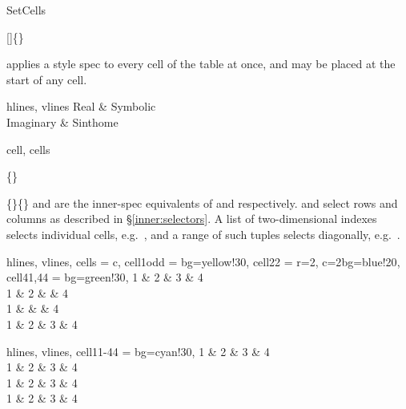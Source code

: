 \begin{codedescribe}[
    code,
    new=2021F,
    update=2021L
  ]{SetCells}
  \begin{codesyntax}
    []\{\} 
  \end{codesyntax}
   applies a style spec to every cell of the table at once, and may be placed at the start of any cell.

  \begin{codestore}[st=span:setcells]
    \begin{tblr}{hlines, vlines}
       Real & Symbolic \\
      Imaginary                       & Sinthome
    \end{tblr}\end{codestore}
  \begin{center}
  \end{center}
\end{codedescribe}

\begin{codedescribe}[
    key,
    new=2021F,
    update=2021L,
    update=2025A
  ]{cell, cells}
  \begin{codesyntax}
    \{\}  
  \end{codesyntax}
  \{\}\{\} and  are the inner-spec equivalents of  and  respectively.  and  select rows and columns as described in \S\ref{inner:selectors}. A list of two-dimensional indexes selects individual cells, e.g.\ , and a range of such tuples selects diagonally, e.g.\ .

  \begin{codestore}[st=span:cell]
    \begin{tblr}{
      hlines, vlines,
      cells = {c},
      cell{1}{odd} = {bg=yellow!30},
      cell{2}{2} = {r=2, c=2}{bg=blue!20},
      cell{{4}{1},{4}{4}} = {bg=green!30},
        }
      1 & 2 & 3 & 4 \\
      1 & 2 &   & 4 \\
      1 &   &   & 4 \\
      1 & 2 & 3 & 4
    \end{tblr}\quad
    \begin{tblr}{
        hlines, vlines,
        cell{{1}{1}-{4}{4}} = {bg=cyan!30},
      }
      1 & 2 & 3 & 4 \\
      1 & 2 & 3 & 4 \\
      1 & 2 & 3 & 4 \\
      1 & 2 & 3 & 4
    \end{tblr}\end{codestore}
  \begin{center}
  \end{center}
\end{codedescribe}

